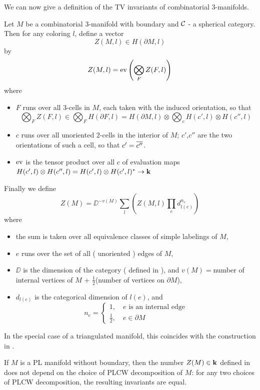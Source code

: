 We can now give a definition of the TV invariants of combinatorial 3-manifolds.

\begin{definition}\label{d:TV_invariant}
	Let $M$ be a combinatorial 3-manifold with boundary and $\mathcal{C}$ - a spherical category. Then for any coloring $l$, 
	define a vector
	\[
		Z(M,l) \in H( \partial M,l)
	\]
	by
	\[
	Z(M,l) = \operatorname{ev}\left( \bigotimes_F Z(F,l) \right)
	\]
	where
	\begin{itemize}
		\item $F$ runs over all 3-cells in $M$, each taken with the induced orientation, so that 
		\[
		\bigotimes_F Z(F,l) \in \bigotimes_F H(\partial F,l) = H(\partial M,l) \otimes \bigotimes_c H(c',l) \otimes H(c'',l)
		\]
		\item $c$ runs over all unoriented 2-cells in the interior of $M$; $c'$,$c''$ are the two orientations of such a cell, so 
		that $c'=\overline{c''}$.
		\item $\operatorname{ev}$ is the tensor product over all $c$ of evaluation maps 
		$H(c',l)\otimes H(c'',l)=H(c',l)\otimes H(c',l)^* \rightarrow \mathbf{k}$
	\end{itemize}
	Finally we define
	\[
	Z(M)= \DD^{-v (M)} \sum_{l} \left(  Z( M,l) \prod_{e} d^{n_e}_{l(e)} \right)
	\]
	where
	\begin{itemize}
		\item the sum is taken over all equivalence classes of simple labelings of $M$,
		\item $e$ runs over the set of all ( unoriented ) edges of $M$,
		\item $\DD$ is the dimension of the category ( defined in ), and $v(M)=$number 
		of internal vertices of $M$ + $\frac{1}{2}$(number of vertices on $\partial M$),
		\item $d_{l(e)} $ is the categorical dimension of $l(e)$, and
		$$ n_e = \begin{cases}
			1,\quad e \text{ is an internal edge}\\
			\tfrac{1}{2},\quad e\in \partial M
		\end{cases}
		$$
	\end{itemize}
\end{definition}

In the special case of a triangulated manifold, this coincides with the construction in .

\begin{theorem}\label{t:main1}
	If $M$ is a PL manifold without boundary, then the number $Z(M) \in \mathbf{k}$ defined in  
	does not depend on the choice of PLCW decomposition of $M$: for any two choices of PLCW decomposition, 
	the resulting invariants are equal.
\end{theorem}

